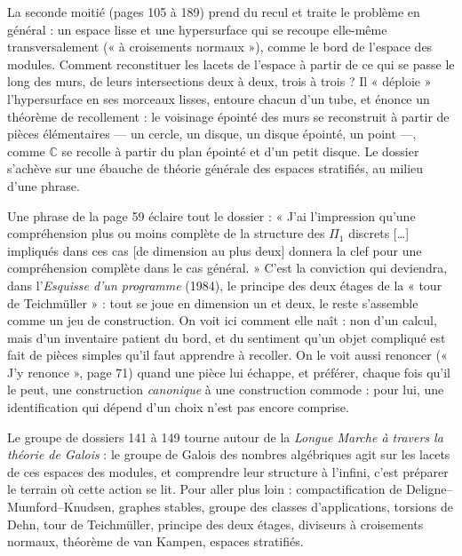 \documentclass[11pt,a4paper]{article}
\begin{document}
\begin{resume}
La seconde moitié (pages 105 à 189) prend du recul et traite le problème en
général : un espace lisse et une hypersurface qui se recoupe elle-même
transversalement (« à croisements normaux »), comme le bord de l'espace des
modules. Comment reconstituer les lacets de l'espace à partir de ce qui se
passe le long des murs, de leurs intersections deux à deux, trois à trois ? Il
« déploie » l'hypersurface en ses morceaux lisses, entoure chacun d'un tube,
et énonce un théorème de recollement : le voisinage épointé des murs se
reconstruit à partir de pièces élémentaires — un cercle, un disque, un disque
épointé, un point —, comme $\mathbb{C}$ se recolle à partir du plan épointé et
d'un petit disque. Le dossier s'achève sur une ébauche de théorie générale des
espaces stratifiés, au milieu d'une phrase.

Une phrase de la page 59 éclaire tout le dossier : « J'ai l'impression qu'une
compréhension plus ou moins complète de la structure des $\Pi_1$ discrets […]
impliqués dans ces cas [de dimension au plus deux] donnera la clef pour une
compréhension complète dans le cas général. » C'est la conviction qui deviendra,
dans l'\emph{Esquisse d'un programme} (1984), le principe des deux étages de la
« tour de Teichmüller » : tout se joue en dimension un et deux, le reste
s'assemble comme un jeu de construction. On voit ici comment elle naît : non
d'un calcul, mais d'un inventaire patient du bord, et du sentiment qu'un objet
compliqué est fait de pièces simples qu'il faut apprendre à recoller. On le
voit aussi renoncer (« J'y renonce », page 71) quand une pièce lui échappe, et
préférer, chaque fois qu'il le peut, une construction \emph{canonique} à une
construction commode : pour lui, une identification qui dépend d'un choix n'est
pas encore comprise.

Le groupe de dossiers 141 à 149 tourne autour de la \emph{Longue Marche à travers
la théorie de Galois} : le groupe de Galois des nombres algébriques agit sur
les lacets de ces espaces des modules, et comprendre leur structure à l'infini,
c'est préparer le terrain où cette action se lit. Pour aller plus loin :
compactification de Deligne--Mumford--Knudsen, graphes stables, groupe des
classes d'applications, torsions de Dehn, tour de Teichmüller, principe des deux
étages, diviseurs à croisements normaux, théorème de van Kampen, espaces
stratifiés.

\end{resume}
\end{document}
